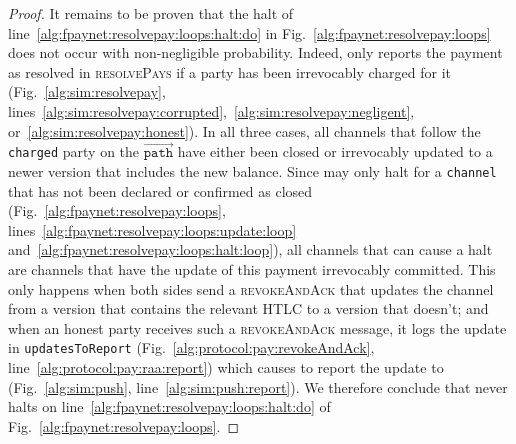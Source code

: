 \begin{proof}
  It remains to be proven that the halt of
  line~\ref{alg:fpaynet:resolvepay:loops:halt:do} in
  Fig.~\ref{alg:fpaynet:resolvepay:loops} does not occur with non-negligible
  probability. Indeed, \simulator{} only reports the payment as resolved in
  \textsc{resolvePays} if a party has been irrevocably charged for it
  (Fig.~\ref{alg:sim:resolvepay},
  lines~\ref{alg:sim:resolvepay:corrupted},~\ref{alg:sim:resolvepay:negligent},
  or~\ref{alg:sim:resolvepay:honest}). In all three cases, all channels that
  follow the \texttt{charged} party on the $\overrightarrow{\mathtt{path}}$ have
  either been closed or irrevocably updated to a newer version that includes the
  new balance. Since \fpaynet{} may only halt for a \texttt{channel} that has
  not been declared or confirmed as closed
  (Fig.~\ref{alg:fpaynet:resolvepay:loops},
  lines~\ref{alg:fpaynet:resolvepay:loops:update:loop}
  and~\ref{alg:fpaynet:resolvepay:loops:halt:loop}), all channels that can cause
  a halt are channels that have the update of this payment irrevocably
  committed. This only happens when both sides send a \textsc{revokeAndAck} that
  updates the channel from a version that contains the relevant HTLC to a
  version that doesn't; and when an honest party receives such a
  \textsc{revokeAndAck} message, it logs the update in \texttt{updatesToReport}
  (Fig.~\ref{alg:protocol:pay:revokeAndAck},
  line~\ref{alg:protocol:pay:raa:report}) which causes \simulator{} to report
  the update to \fpaynet{} (Fig.~\ref{alg:sim:push},
  line~\ref{alg:sim:push:report}). We therefore conclude that \fpaynet{} never
  halts on line~\ref{alg:fpaynet:resolvepay:loops:halt:do} of
  Fig.~\ref{alg:fpaynet:resolvepay:loops}.
\end{proof}
